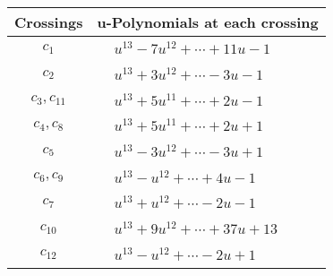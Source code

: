 \documentclass[1p]{elsarticle_modified}
\theoremstyle{definition}
\begin{document}
\begin{tabular}{m{50pt}|m{274pt}}
Crossings & \hspace{64pt}u-Polynomials at each crossing \\
\hline $$\begin{aligned}c_{1}\end{aligned}$$&$\begin{aligned}
&u^{13}-7 u^{12}+\cdots+11 u-1
\end{aligned}$\\
\hline $$\begin{aligned}c_{2}\end{aligned}$$&$\begin{aligned}
&u^{13}+3 u^{12}+\cdots-3 u-1
\end{aligned}$\\
\hline $$\begin{aligned}c_{3},c_{11}\end{aligned}$$&$\begin{aligned}
&u^{13}+5 u^{11}+\cdots+2 u-1
\end{aligned}$\\
\hline $$\begin{aligned}c_{4},c_{8}\end{aligned}$$&$\begin{aligned}
&u^{13}+5 u^{11}+\cdots+2 u+1
\end{aligned}$\\
\hline $$\begin{aligned}c_{5}\end{aligned}$$&$\begin{aligned}
&u^{13}-3 u^{12}+\cdots-3 u+1
\end{aligned}$\\
\hline $$\begin{aligned}c_{6},c_{9}\end{aligned}$$&$\begin{aligned}
&u^{13}- u^{12}+\cdots+4 u-1
\end{aligned}$\\
\hline $$\begin{aligned}c_{7}\end{aligned}$$&$\begin{aligned}
&u^{13}+u^{12}+\cdots-2 u-1
\end{aligned}$\\
\hline $$\begin{aligned}c_{10}\end{aligned}$$&$\begin{aligned}
&u^{13}+9 u^{12}+\cdots+37 u+13
\end{aligned}$\\
\hline $$\begin{aligned}c_{12}\end{aligned}$$&$\begin{aligned}
&u^{13}- u^{12}+\cdots-2 u+1
\end{aligned}$\\
\hline
\end{tabular}\\~\\
\end{document}
